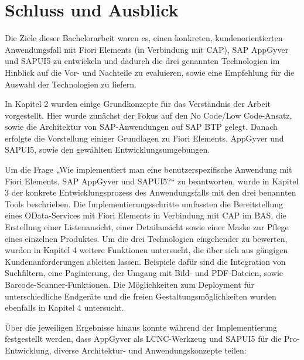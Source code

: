 
\chapter{Schluss und Ausblick}

Die Ziele dieser Bachelorarbeit waren es, einen konkreten, kundenorientierten Anwendungsfall mit Fiori Elements (in Verbindung mit CAP), SAP AppGyver und SAPUI5 zu entwickeln und dadurch die drei genannten Technologien im Hinblick auf die Vor- und Nachteile zu evaluieren, sowie eine Empfehlung für die Auswahl der Technologien zu liefern.

In Kapitel 2 wurden einige Grundkonzepte für das Verständnis der Arbeit vorgestellt. Hier wurde zunächst der Fokus auf den No Code/Low Code-Ansatz, sowie die Architektur von SAP-Anwendungen auf SAP BTP gelegt. Danach erfolgte die Vorstellung einiger Grundlagen zu Fiori Elements, AppGyver und SAPUI5, sowie den gewählten Entwicklungsumgebungen.

Um die Frage „Wie implementiert man eine benutzerspezifische Anwendung mit Fiori Elements, SAP AppGyver und SAPUI5?“ zu beantworten, wurde in Kapitel 3 der konkrete Entwicklungsprozess des Anwendungsfalls mit den drei benannten Tools beschrieben. Die Implementierungsschritte umfassten die Bereitstellung eines OData-Services mit Fiori Elements in Verbindung mit CAP im BAS, die Erstellung einer Listenansicht, einer Detailansicht sowie einer Maske zur Pflege eines einzelnen Produktes. Um die drei Technologien eingehender zu bewerten, wurden in Kapitel 4 weitere Funktionen untersucht, die über sich aus gängigen Kundenanforderungen ableiten lassen. Beispiele dafür sind die Integration von Suchfiltern, eine Paginierung, der Umgang mit Bild- und PDF-Dateien, sowie Barcode-Scanner-Funktionen. Die Möglichkeiten zum Deployment für unterschiedliche Endgeräte und die freien Gestaltungsmöglichkeiten wurden ebenfalls in Kapitel 4 untersucht. 

Über die jeweiligen Ergebnisse hinaus konnte während der Implementierung festgestellt werden, dass AppGyver als LCNC-Werkzeug und SAPUI5 für die Pro-Entwicklung, diverse Architektur- und Anwendungskonzepte teilen:

